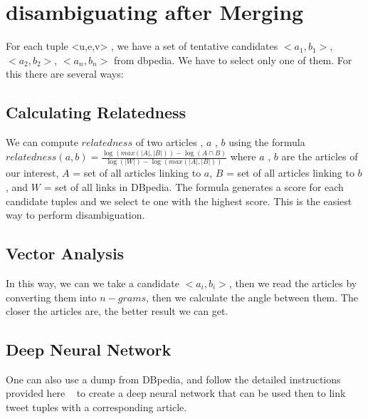 \section{ disambiguating after Merging }
For each tuple <u,e,v> , we have a set of tentative candidates $<a_1, b_1>$, $<a_2, b_2>$, $<a_n, b_n>$ from dbpedia. 
We have to select only one of them. For this there are several ways:
\subsection{Calculating Relatedness}
 We can compute $ relatedness $ of two articles , $a$ , $b$ using the formula 
  $ relatedness(a,b) = \frac{\log(max(|A|, |B|)) - \log(A \cap B) }{ \log( |W| ) - \log(max(|A|, |B|)) } $
where $a$ , $b$ are the articles of our interest, $A$  = set of all articles linking to $a$, $B$ = set of all articles linking to $b$, 
and $W$ = set of all links in DBpedia. The formula generates a score for each candidate tuples and we select te one with the highest score.
This is the easiest way to perform disambiguation.   

\subsection{ Vector Analysis }
In this way, we can we take a candidate $<a_i, b_i>$, then we read the articles by converting them into $n-grams$, 
then we calculate the angle between them. The closer the articles are, the better result we can get. 

\subsection{ Deep Neural Network } 
One can also use a dump from DBpedia, and follow the detailed instructions provided here ~\cite{ref1DeepLearning} 
to create a deep neural network that can be used then to link tweet tuples with a corresponding article.

\endinput